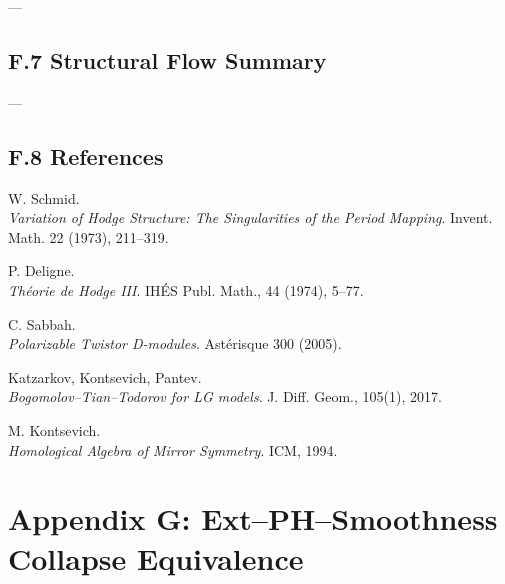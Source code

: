 \documentclass[11pt]{article}
\begin{document}
---

\subsection*{F.7 Structural Flow Summary}

\begin{center}
\end{center}

---

\subsection*{F.8 References}

\begin{thebibliography}{9}

W. Schmid.\\
\textit{Variation of Hodge Structure: The Singularities of the Period Mapping}.  
Invent. Math. 22 (1973), 211–319.

P. Deligne.\\
\textit{Théorie de Hodge III}.  
IHÉS Publ. Math., 44 (1974), 5–77.

C. Sabbah.\\
\textit{Polarizable Twistor D-modules}.  
Astérisque 300 (2005).

Katzarkov, Kontsevich, Pantev.\\
\textit{Bogomolov–Tian–Todorov for LG models}.  
J. Diff. Geom., 105(1), 2017.

M. Kontsevich.\\
\textit{Homological Algebra of Mirror Symmetry}.  
ICM, 1994.

\end{thebibliography}



\section*{Appendix G: Ext–PH–Smoothness Collapse Equivalence}
\end{document}
